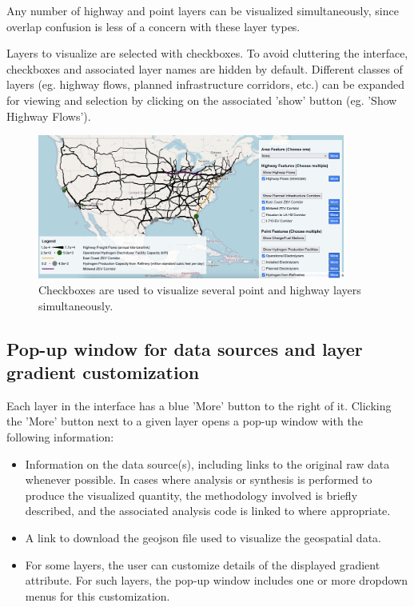 Any number of highway and point layers can be visualized simultaneously, since overlap confusion is less of a concern with these layer types. 

Layers to visualize are selected with checkboxes. To avoid cluttering the interface,  checkboxes and associated layer names are hidden by default. Different classes of layers (eg. highway flows, planned infrastructure corridors, etc.) can be expanded for viewing and selection by clicking on the associated 'show' button (eg. 'Show Highway Flows'). 

\begin{figure}[ht]
        \centering
        \includegraphics[width=0.9\textwidth]{figures/checkboxes.png}
        \caption{Checkboxes are used to visualize several point and highway layers simultaneously.}
        \label{fig:checkboxes}
\end{figure}

\subsection{Pop-up window for data sources and layer gradient customization}

Each layer in the interface has a blue 'More' button to the right of it. Clicking the 'More' button next to a given layer opens a pop-up window with the following information:

\begin{itemize}
    \item Information on the data source(s), including links to the original raw data whenever possible. In cases where analysis or synthesis is performed to produce the visualized quantity, the methodology involved is briefly described, and the associated analysis code is linked to where appropriate.
    \item A link to download the geojson file used to visualize the geospatial data. 
    \item For some layers, the user can customize details of the displayed gradient attribute. For such layers, the pop-up window includes one or more dropdown menus for this customization.
\end{itemize}

